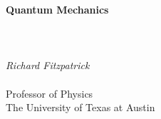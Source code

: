 \documentclass[12pt]{rfbook}
\begin{document}
\pagestyle{fancy}
\renewcommand{\chaptermark}[1]{
\markboth{#1}{}}
\fancyhf{}
\fancyhead[LO,RE]{\sl \leftmark}
\fancyhead[LE,RO]{\sl \thepage}

\thispagestyle{empty}
\begin{center}
{\Huge\bf Quantum Mechanics}\\[1ex]
~\\
~\\
~\\
{\Large\em  Richard Fitzpatrick}\\[1.5ex]~\\[1.5ex]
{\Large\sf  Professor  of Physics}\\[1.5ex]
{\Large\sf  The University of Texas at Austin}\\[10ex]
\end{center}

\tableofcontents








\end{document}
